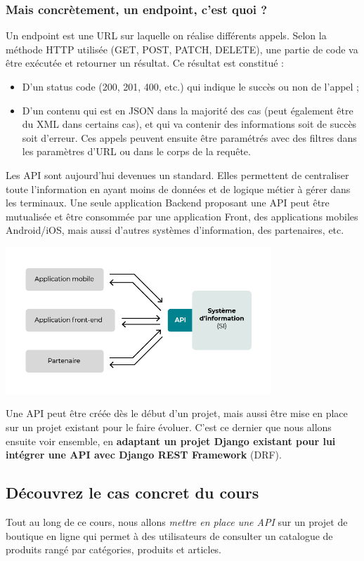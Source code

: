 \subsubsection*{Mais concrètement, un endpoint, c’est quoi ?}
Un endpoint est une URL sur laquelle on réalise différents appels. Selon la méthode HTTP utilisée (GET, POST, PATCH, DELETE), une partie de code va être exécutée et retourner un résultat. Ce résultat est constitué :
\begin{itemize}
\item D’un status code (200, 201, 400, etc.) qui indique le succès ou non de l’appel ;
\item D’un contenu qui est en JSON dans la majorité des cas (peut également être du XML dans certains cas), et qui va contenir des informations soit de succès soit d’erreur.
Ces appels peuvent ensuite être paramétrés avec des filtres dans les paramètres d’URL ou dans le corps de la requête.
\end{itemize}

Les API sont aujourd’hui devenues un standard. Elles permettent de centraliser toute l’information en ayant moins de données et de logique métier à gérer dans les terminaux. Une seule application Backend proposant une API peut être mutualisée et être consommée par une application Front, des applications mobiles Android/iOS, mais aussi d’autres systèmes d’information, des partenaires, etc.

\begin{center}
\includegraphics[width=10cm]{images/image01.png}
\end{center}

Une API peut être créée dès le début d’un projet, mais aussi être mise en place sur un projet existant pour le faire évoluer. C’est ce dernier que nous allons ensuite voir ensemble, en {\bf adaptant un projet Django existant pour lui intégrer une API avec {\color{monOrange}Django REST Framework}} (DRF).
\subsection{Découvrez le cas concret du cours}
Tout au long de ce cours, nous allons {\em mettre en place une {\color{monOrange}API}} sur un projet de boutique en ligne qui permet à des utilisateurs de consulter un catalogue de produits rangé par catégories, produits et articles. 

